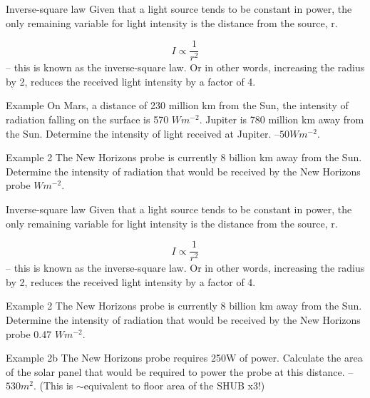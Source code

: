 \documentclass[../Main.tex]{subfiles}
\begin{document}
\begin{frame}{Inverse-square law}
    Given that a light source tends to be constant in power, the only remaining variable for light intensity is the distance from the source, r.
    
    \begin{equation*}
        I \propto \frac{1}{r^2}
    \end{equation*} -- this is known as the inverse-square law. Or in other words, increasing the radius by 2, reduces the received light intensity by a factor of 4.
    \pause
    \begin{exampleblock}{Example}
    On Mars, a distance of 230 million km from the Sun, the intensity of radiation falling on the surface is 570 $Wm^{-2}$. Jupiter is 780 million km away from the Sun. Determine the intensity of light received at Jupiter. \pause
    --$50Wm^{-2}$.
    \end{exampleblock} \pause
    
    \begin{exampleblock}{Example 2}
    The New Horizons probe is currently 8 billion km away from the Sun. Determine the intensity of radiation that would be received by the New Horizons probe  $Wm^{-2}$.
    \end{exampleblock}
\end{frame}

\begin{frame}{Inverse-square law}
    Given that a light source tends to be constant in power, the only remaining variable for light intensity is the distance from the source, r.
    
    \begin{equation*}
        I \propto \frac{1}{r^2}
    \end{equation*} -- this is known as the inverse-square law. Or in other words, increasing the radius by 2, reduces the received light intensity by a factor of 4.
    
    
    \begin{exampleblock}{Example 2}
    The New Horizons probe is currently 8 billion km away from the Sun. Determine the intensity of radiation that would be received by the New Horizons probe 
    0.47 $Wm^{-2}$.
    \end{exampleblock}
    
    \begin{exampleblock}{Example 2b}
    The New Horizons probe requires 250W of power. Calculate the area of the solar panel that would be required to power the probe at this distance. \pause 
    --$530m^2$. (This is $\sim$equivalent to floor area of the SHUB x3!)
    \end{exampleblock}
\end{frame}
\end{document}

